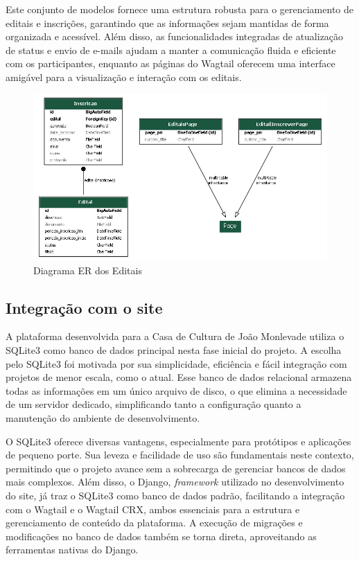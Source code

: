 Este conjunto de modelos fornece uma estrutura robusta para o gerenciamento de editais e inscrições, garantindo que as informações sejam mantidas de forma organizada e acessível. Além disso, as funcionalidades integradas de atualização de status e envio de e-mails ajudam a manter a comunicação fluida e eficiente com os participantes, enquanto as páginas do Wagtail oferecem uma interface amigável para a visualização e interação com os editais.

\begin{figure}[htb]
	\caption{\label{fig_grafico}Diagrama ER dos Editais}
	\begin{center}
	    \includegraphics[scale=0.3]{./img/er_diagram_editais.png}
	\end{center}
\end{figure}


\subsection{Integração com o site}

A plataforma desenvolvida para a Casa de Cultura de João Monlevade utiliza o SQLite3 como banco de dados principal nesta fase inicial do projeto. A escolha pelo SQLite3 foi motivada por sua simplicidade, eficiência e fácil integração com projetos de menor escala, como o atual. Esse banco de dados relacional armazena todas as informações em um único arquivo de disco, o que elimina a necessidade de um servidor dedicado, simplificando tanto a configuração quanto a manutenção do ambiente de desenvolvimento.

O SQLite3 oferece diversas vantagens, especialmente para protótipos e aplicações de pequeno porte. Sua leveza e facilidade de uso são fundamentais neste contexto, permitindo que o projeto avance sem a sobrecarga de gerenciar bancos de dados mais complexos. Além disso, o Django, \textit{framework} utilizado no desenvolvimento do site, já traz o SQLite3 como banco de dados padrão, facilitando a integração com o Wagtail e o Wagtail CRX, ambos essenciais para a estrutura e gerenciamento de conteúdo da plataforma. A execução de migrações e modificações no banco de dados também se torna direta, aproveitando as ferramentas nativas do Django.

